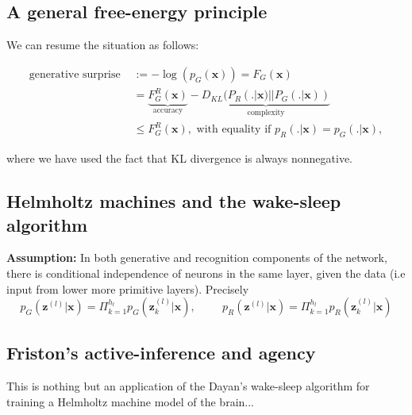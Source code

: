 \documentclass[10pt,letterpaper]{article}
\newtheorem{theorem}{Theorem} \newtheorem{lemma}[theorem]{Lemma}
\def\z{\mathbf{z}}
\def\x{\mathbf{x}}
\begin{document}
\subsection{A general free-energy principle}
We can resume the situation as follows:
\begin{mdframed}
\begin{equation}
  \begin{split}
    \text{generative surprise } &:= -\log(p_G(\x)) = F_G(\x) \\
    &=\underbrace{F^R_G(\x)}_{\text{accuracy}} - \underbrace{D_{KL}(P_R(.|\x) || P_G(.|\x))}_{\text{complexity}} \\
    &\le F^R_G(\x),
    \text{ with equality if }p_R(.|\x) = p_G(.|\x),
    \end{split}
\end{equation}
\end{mdframed}
where we have used the fact that KL divergence is always nonnegative.

\subsection{Helmholtz machines and the wake-sleep algorithm}
  \textbf{Assumption:} In both generative and recognition components of the network, there is conditional independence of  neurons in the same layer, given the data (i.e input from lower more primitive layers). Precisely
$$
p_G(\z^{(l)}|\x) = \Pi_{k=1}^{h_l}p_G(\z_k^{(l)} | \x),\hspace{1cm}
p_R(\z^{(l)}|\x) = \Pi_{k=1}^{h_l}p_R(\z_k^{(l)} |\x)
$$

\subsection{Friston's active-inference and agency}
\label{sec:friston}
This is nothing but an application of the Dayan's wake-sleep algorithm for training a Helmholtz machine model of the brain...
\end{document}
